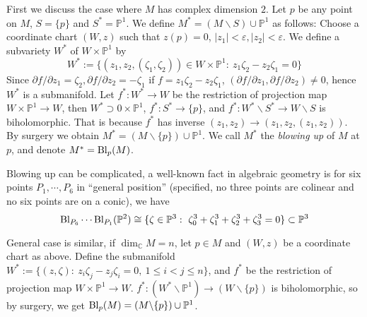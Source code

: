 \begin{eg}[Blowing up]
    First we discuss the case where $M$ has complex dimension $2$.
    Let $p$ be any point on $M$, $S=\{p\}$ and $S^*=\mathbb{P}^1$.
    We define $M^*=(M\backslash S)\cup\mathbb{P}^1$ as follows:
    Choose a coordinate chart $(W,z)$ such that $z(p)=0$, $|z_1|<\varepsilon,|z_2|<\varepsilon$.
    We define a subvariety $W^*$ of $W\times\mathbb{P}^1$ by
    \[W^*:=\{(z_1,z_2,(\zeta_1,\zeta_2))\in W\times\mathbb{P}^1:\ z_1\zeta_2-z_2\zeta_1=0\}\]
    Since $\partial{f}/\partial{z_1}=\zeta_2,\partial{f}/\partial{z_2}=-\zeta_1$ if $f=z_1\zeta_2-z_2\zeta_1$, $(\partial{f}/\partial{z_1},\partial{f}/\partial{z_2})\neq 0$, hence $W^*$ is a submanifold.
    Let $f^*:W^*\to W$ be the restriction of projection map $W\times\mathbb{P}^1\to W$, then $W^*\supset 0\times\mathbb{P}^1$, $f^*:S^*\to\{p\}$, and $f^*:W^*\backslash S^*\to W\backslash S$ is biholomorphic.
    That is because $f^*$ has inverse $(z_1,z_2)\to(z_1,z_2,(z_1,z_2))$.
    By surgery we obtain $M^*=(M\backslash\{p\})\cup\mathbb{P}^1$.
    We call $M^*$ the \emph{blowing up} of $M$ at $p$, and denote $M^*=\operatorname{Bl}_p(M)$.

    Blowing up can be complicated, a well-known fact in algebraic geometry is for six points $P_1,\cdots,P_6$ in ``general position'' (specified, no three points are colinear and no six points are on a conic), we have
    \[\Bl_{P_6}\cdots\Bl_{P_1}(\mathbb{P}^2)\cong\{\zeta\in\mathbb{P}^3:\ \zeta_0^3+\zeta_1^3+\zeta_2^3+\zeta_3^3=0\}\subset\mathbb{P}^3\]

    General case is similar, if $\dim_\mathbb{C}M=n$, let $p\in M$ and $(W,z)$ be a coordinate chart as above.
    Define the submanifold $W^*:=\{(z,\zeta):\ z_i\zeta_j-z_j\zeta_i=0,\ 1\leq i<j\leq n\}$, and $f^*$ be the restriction of projection map $W\times\mathbb{P}^1\to W$.
    $f^*:(W^*\backslash\mathbb{P}^1)\to(W\backslash\{p\})$ is biholomorphic, so by surgery, we get $\operatorname{Bl}_p(M)=(M\backslash\{p\})\cup\mathbb{P}^1$.
\end{eg}